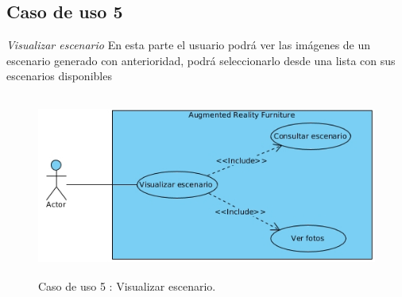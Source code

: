 \newpage
\subsection{Caso de uso 5}\textit{Visualizar escenario} 
En esta parte el usuario podrá ver las imágenes de un escenario generado con anterioridad, podrá seleccionarlo desde una lista con sus escenarios disponibles
\begin{figure}[h!]
	\centering
	\includegraphics[width=12cm,height=6cm]{imagenes/analisis/visualizarEscenario.jpg}
	\caption{Caso de uso 5 : Visualizar escenario.}
	\label{fig:analogo}
\end{figure}